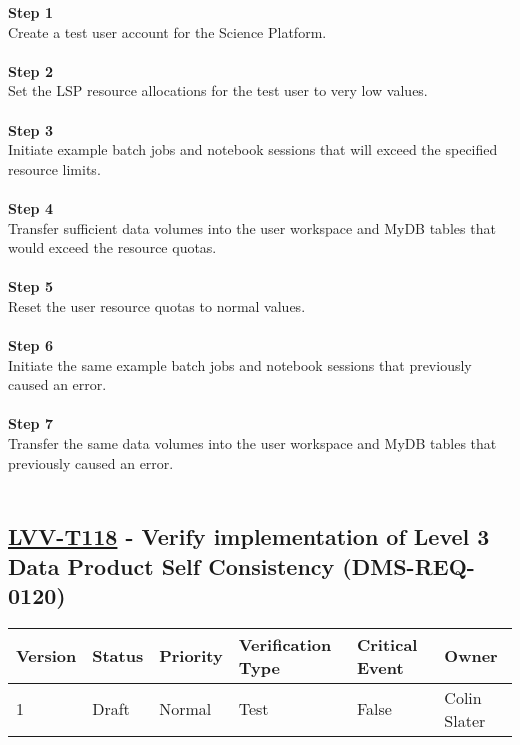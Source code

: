 \textbf{Step 1}\\
Create a test user account for the Science Platform.\\
~\\
\textbf{Step 2}\\
Set the LSP resource allocations for the test user to very low values.\\
~\\
\textbf{Step 3}\\
Initiate example batch jobs and notebook sessions that will exceed the
specified resource limits.\\
~\\
\textbf{Step 4}\\
Transfer sufficient data volumes into the user workspace and MyDB tables
that would exceed the resource quotas.\\
~\\
\textbf{Step 5}\\
Reset the user resource quotas to normal values.\\
~\\
\textbf{Step 6}\\
Initiate the same example batch jobs and notebook sessions that
previously caused an error.\\
~\\
\textbf{Step 7}\\
Transfer the same data volumes into the user workspace and MyDB tables
that previously caused an error.\\
~\\

\hypertarget{lvv-t118---verify-implementation-of-level-3-data-product-self-consistency-dms-req-0120}{%
\subsection{\texorpdfstring{\href{https://jira.lsstcorp.org/secure/Tests.jspa\#/testCase/LVV-T118}{LVV-T118}
- Verify implementation of Level 3 Data Product Self Consistency
(DMS-REQ-0120)}{LVV-T118 - Verify implementation of Level 3 Data Product Self Consistency (DMS-REQ-0120)}}\label{lvv-t118---verify-implementation-of-level-3-data-product-self-consistency-dms-req-0120}}

\begin{longtable}[]{@{}llllll@{}}
\toprule
Version & Status & Priority & Verification Type & Critical Event &
Owner\tabularnewline
\midrule
\endhead
1 & Draft & Normal & Test & False & Colin Slater\tabularnewline
\bottomrule
\end{longtable}

